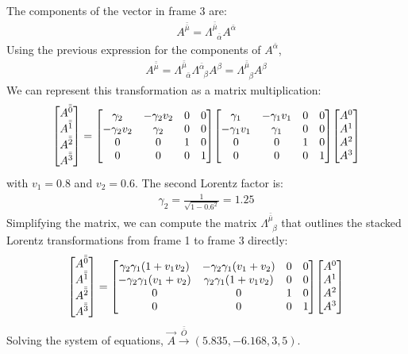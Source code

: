 \documentclass{report}
\begin{document}
\begin{subquests}
\begin{subquests}
		\item %
		The components of the vector in frame 3 are:
		\begin{gather*}
				A^{\bar{\bar{\mu}}}=\Lambda^{\bar{\bar{\mu}}}_{\;\;\bar{\alpha}}A^{\bar{\alpha}} 
		\end{gather*}
		Using the previous expression for the components of $A^{\bar{\alpha}}$,
		\begin{gather*}			A^{\bar{\bar{\mu}}}=\Lambda^{\bar{\bar{\mu}}}_{\;\;\bar{\alpha}}\Lambda^{\bar{\alpha}}_{\;\;\beta}A^{\beta}=\Lambda^{\bar{\bar{\mu}}}_{\;\;\beta}A^{\beta}
		\end{gather*}
		We can represent this transformation as a matrix multiplication:
		\begin{gather*}
			\mqty[
		 		A^{\bar{\bar{0}}} \\
				A^{\bar{\bar{1}}} \\
				A^{\bar{\bar{2}}} \\
				A^{\bar{\bar{3}}}
			]
			=
			\mqty[
			 	\gamma_{2} & -\gamma_{2} v_{2} & 0 & 0 \\
				-\gamma_{2} v_{2} & \gamma_{2} & 0 & 0 \\
				0 & 0 & 1 & 0 \\
				0 & 0 & 0 & 1
			]
			\mqty[
			 	\gamma_{1} & -\gamma_{1} v_{1} & 0 & 0 \\
				-\gamma_{1} v_{1} & \gamma_{1} & 0 & 0 \\
				0 & 0 & 1 & 0 \\
				0 & 0 & 0 & 1
			]
		 	\mqty[
		 		A^{0} \\
				A^{1} \\
				A^{2} \\
				A^{3}
		 	]
		\end{gather*}
		with $v_{1} = 0.8$ and $v_{2} = 0.6$. The second Lorentz factor is:
		\begin{gather*}
			\gamma_{2} = \frac{1}{\sqrt{1-0.6^2}} = 1.25 
		\end{gather*}
		Simplifying the matrix, we can compute the matrix $\Lambda^{\bar{\bar{\mu}}}_{\;\;\beta}$ that outlines the stacked Lorentz transformations from frame 1 to frame 3 directly:
		\begin{gather*}
			\mqty[
		 		A^{\bar{\bar{0}}} \\
				A^{\bar{\bar{1}}} \\
				A^{\bar{\bar{2}}} \\
				A^{\bar{\bar{3}}}
			]
			=
			\mqty[
			 	\gamma_{2}\gamma_{1}(1+v_{1}v_{2}) & -\gamma_{2}\gamma_{1}(v_{1}+v_{2}) & 0 & 0 \\
				-\gamma_{2}\gamma_{1}(v_{1}+v_{2}) & \gamma_{2}\gamma_{1}(1+v_{1}v_{2}) & 0 & 0 \\
				0 & 0 & 1 & 0 \\
				0 & 0 & 0 & 1
			]
		 	\mqty[
		 		A^{0} \\
				A^{1} \\
				A^{2} \\
				A^{3}
		 	]
		\end{gather*}
		Solving the system of equations, ${\vec A} \stackrel{\bar{\bar{O}}}{\longrightarrow} (5.835,-6.168,3,5)$.


\end{subquests}
\end{subquests}
\end{document}
